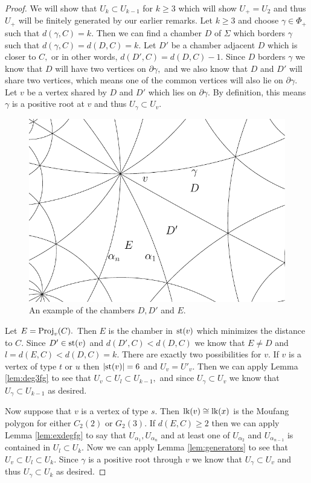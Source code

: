 \documentclass[class=book, crop=false]{standalone}
\begin{document}
\begin{proof}
	We will show that $U_k\subset U_{k-1}$ for $k\ge 3$ which will show $U_+=U_2$ and thus $U_+$ will be finitely generated by our earlier remarks. Let $k\ge 3$ and choose $\gamma\in \Phi_+$ such that $d(\gamma,C)=k.$ Then we can find a chamber $D$ of $\Sigma$ which borders $\gamma$ such that $d(\gamma,C)=d(D,C)=k.$ Let $D'$ be a chamber adjacent $D$ which is closer to $C,$ or in other words, $d(D',C)=d(D,C)-1.$ Since $D$ borders $\gamma$ we know that $D$ will have two vertices on $\partial \gamma,$ and we also know that $D$ and $D'$ will share two vertices, which means one of the common vertices will also lie on $\partial\gamma.$ Let $v$ be a vertex shared by $D$ and $D'$ which lies on $\partial \gamma.$ By definition, this means $\gamma$ is a positive root at $v$ and thus $U_\gamma\subset U_v.$

	\begin{figure}[h]
	\begin{center}
		\includegraphics[width=3.5 in]{diagrams/vdef.pdf}
	\end{center}	
	\caption{An example of the chambers $D,D'$ and $E.$}
		\label{fig:vdef}
	\end{figure}

	Let $E=\mathrm{Proj}_v(C).$ Then $E$ is the chamber in $\mathrm{st}(v)$ which minimizes the distance to $C.$ Since $D'\in \mathrm{st}(v)$ and $d(D',C)<d(D,C)$ we know that $E\neq D$ and $l=d(E,C)<d(D,C)=k.$ There are exactly two possibilities for $v.$ If $v$ is a vertex of type $t$ or $u$ then $|\mathrm{st}(v)|=6$ and $U_v=U'_v.$ Then we can apply Lemma \ref{lem:deg3fg} to see that $U_v\subset U_l\subset U_{k-1},$ and since $U_\gamma \subset U_v$ we know that $U_\gamma \subset U_{k-1}$ as desired.

	Now suppose that $v$ is a vertex of type $s.$ Then $\mathrm{lk}(v)\cong \mathrm{lk}(x)$ is the Moufang polygon for either $C_2(2)$ or $G_2(3).$ If $d(E,C)\ge 2$ then we can apply Lemma \ref{lem:exdegfg} to say that $U_{\alpha_1},U_{\alpha_n}$ and at least one of $U_{\alpha_2}$ and $U_{\alpha_{n-1}}$ is contained in $U_l\subset U_k.$ Now we can apply Lemma \ref{lem:generators} to see that $U_v\subset U_l\subset U_k.$ Since $\gamma$ is a positive root through $v$ we know that $U_\gamma \subset U_v$ and thus $U_\gamma\subset U_k$ as desired.


\end{proof}
\end{document}
